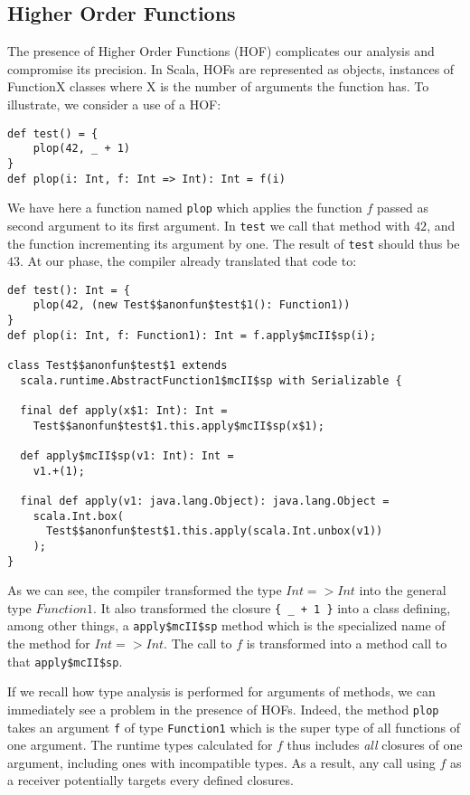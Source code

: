\subsection{Higher Order Functions}
The presence of Higher Order Functions (HOF) complicates our analysis and
compromise its precision. In Scala, HOFs are represented as objects, instances
of FunctionX classes where X is the number of arguments the function has. To
illustrate, we consider a use of a HOF:
\begin{lstlisting}
def test() = {
    plop(42, _ + 1)
}
def plop(i: Int, f: Int => Int): Int = f(i)
\end{lstlisting}
We have here a function named \verb/plop/ which applies the function $f$ passed
as second argument to its first argument. In \verb/test/ we call that method
with $42$, and the function incrementing its argument by one. The result of
\verb/test/ should thus be $43$. At our phase, the compiler already
translated that code to:
\begin{lstlisting}
def test(): Int = {
    plop(42, (new Test$$anonfun$test$1(): Function1))
}
def plop(i: Int, f: Function1): Int = f.apply$mcII$sp(i);

class Test$$anonfun$test$1 extends
  scala.runtime.AbstractFunction1$mcII$sp with Serializable {

  final def apply(x$1: Int): Int =
    Test$$anonfun$test$1.this.apply$mcII$sp(x$1);

  def apply$mcII$sp(v1: Int): Int =
    v1.+(1);

  final def apply(v1: java.lang.Object): java.lang.Object =
    scala.Int.box(
      Test$$anonfun$test$1.this.apply(scala.Int.unbox(v1))
    );
}

\end{lstlisting}
As we can see, the compiler transformed the type $Int => Int$ into the general
type $Function1$. It also transformed the closure \verb/{ _ + 1 }/ into a class
defining, among other things, a \verb/apply$mcII$sp/ method which is the
specialized name of the method for $Int => Int$. The call to $f$ is transformed
into a method call to that \verb/apply$mcII$sp/.

If we recall how type analysis is performed for arguments of methods, we can
immediately see a problem in the presence of HOFs. Indeed, the method
\verb/plop/ takes an argument \verb/f/ of type \verb/Function1/ which is the
super type of all functions of one argument. The runtime types calculated for
$f$ thus includes \emph{all} closures of one argument, including ones with
incompatible types. As a result, any call using $f$ as a receiver
potentially targets every defined closures.

